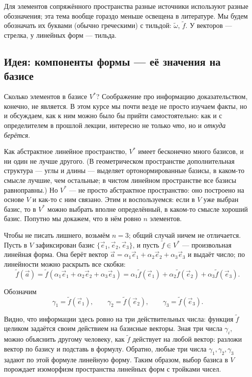 \documentclass[11pt,a4paper]{article}
\begin{document}
Для элементов сопряжённого пространства разные источники используют разные обозначения; эта тема вообще гораздо меньше освещена в литературе. Мы будем обозначать их буквами (обычно греческими) с тильдой: $\tilde\omega$, $\tilde f$. У векторов — стрелка, у линейных форм — тильда.

\subsection{Идея: компоненты формы — её значения на базисе}

Сколько элементов в базисе $V^*$? Соображение про информацию доказательством, конечно, не является. В этом курсе мы почти везде не просто изучаем факты, но и обсуждаем, как к ним можно было бы прийти самостоятельно: как и с определителем в прошлой лекции, интересно не только \emph{что}, но и \emph{откуда берётся}.

Как абстрактное линейное пространство, $V^*$ имеет бесконечно много базисов, и ни один не лучше другого. (В геометрическом пространстве дополнительная структура — углы и длины — выделяет ортонормированные базисы, в каком-то смысле лучшие, чем остальные; в чистом линейном пространстве все базисы равноправны.) Но $V^*$ — не просто абстрактное пространство: оно построено на основе $V$ и как-то с ним связано. Этим и воспользуемся: если в $V$ уже выбран базис, то в $V^*$ можно выбрать вполне определённый, в каком-то смысле хороший базис. Попутно мы докажем, что в нём ровно $n$ элементов.

Чтобы не писать лишнего, возьмём $n = 3$; общий случай ничем не отличается. Пусть в $V$ зафиксирован базис $\{\vec e_1, \vec e_2, \vec e_3\}$, и пусть $\tilde f \in V^*$ — произвольная линейная форма. Она берёт вектор $\vec a = \alpha_1 \vec e_1 + \alpha_2 \vec e_2 + \alpha_3 \vec e_3$ и выдаёт число; по линейности можно раскрыть все скобки:
\[
\tilde f(\vec a) = \tilde f(\alpha_1 \vec e_1 + \alpha_2 \vec e_2 + \alpha_3 \vec e_3) = \alpha_1 \tilde f(\vec e_1) + \alpha_2 \tilde f(\vec e_2) + \alpha_3 \tilde f(\vec e_3).
\]

Обозначим
\[
\gamma_1 = \tilde f(\vec e_1), \qquad \gamma_2 = \tilde f(\vec e_2), \qquad \gamma_3 = \tilde f(\vec e_3).
\]

Видно, что информации здесь ровно на три действительных числа: функция $\tilde f$ целиком задаётся своим действием на базисные векторы. Зная три числа $\gamma_i$, можно объяснить другому человеку, как $\tilde f$ действует на любой вектор: разложи вектор по базису и подставь в формулу. Обратно, любые три числа $\gamma_1, \gamma_2, \gamma_3$ задают по этой формуле линейную форму. Таким образом, выбор базиса в $V$ порождает изоморфизм пространства линейных форм с тройками чисел.
\end{document}
